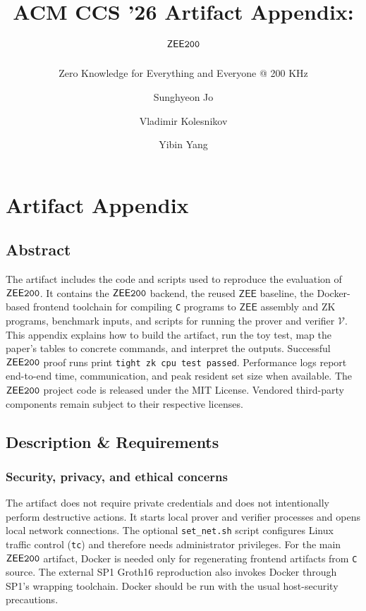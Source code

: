 \documentclass[nonacm,sigconf]{acmart}
\newcommand{\oursystem}{$\mathsf{ZEE}\tt{200}$\xspace}
\newcommand{\zee}[0]{\ensuremath{\mathsf{ZEE}}\xspace}
\let\P\undefined
\newcommand{\P}{\ensuremath{\mathcal{P}}\xspace}
\newcommand{\V}{\ensuremath{\mathcal{V}}\xspace}
\newcommand{\passmsg}{\texttt{tight zk cpu test passed}}
\begin{document}
\title{ACM CCS '26 Artifact Appendix:\\ \oursystem}
\subtitle{Zero Knowledge for Everything and Everyone @ 200 KHz}

\author{Sunghyeon Jo}
\author{Vladimir Kolesnikov}
\author{Yibin Yang}
\renewcommand{\shortauthors}{Jo et al.}

\maketitle

\appendix

\section{Artifact Appendix}

\subsection{Abstract}

The artifact includes the code and scripts used to reproduce the
evaluation of \oursystem. It contains the \oursystem backend, the reused \zee
baseline, the Docker-based frontend toolchain for compiling {\tt C} programs
to \zee assembly and ZK programs, benchmark inputs, and scripts for
running the prover \P and verifier \V. This appendix explains how to build
the artifact, run the toy test, map the paper's tables to concrete
commands, and interpret the outputs. Successful \oursystem proof runs print
\passmsg. Performance logs report end-to-end time, communication, and
peak resident set size when available. The \oursystem project code is
released under the MIT License. Vendored third-party components remain
subject to their respective licenses.

\subsection{Description \& Requirements}

\subsubsection{Security, privacy, and ethical concerns}

The artifact does not require private credentials and does not
intentionally perform destructive actions. It starts local prover and
verifier processes and opens local network connections. The optional
\texttt{set\_net.sh} script configures Linux traffic control
(\texttt{tc}) and therefore needs administrator privileges. For the main
\oursystem artifact, Docker is needed only for regenerating frontend
artifacts from {\tt C} source. The external SP1 Groth16 reproduction
also invokes Docker through SP1's wrapping toolchain. Docker should be
run with the usual host-security precautions.
\end{document}
